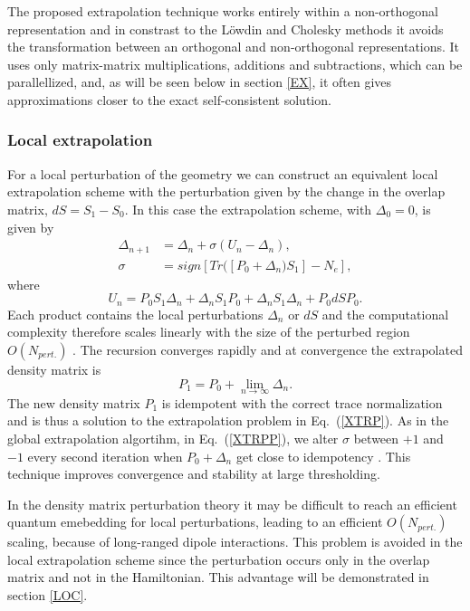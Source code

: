 \documentclass[twocolumn,showpacs,preprintnumbers,amsmath,amssymb]{revtex4}
\begin{document}
The proposed extrapolation technique works entirely within a non-orthogonal representation and 
in constrast to the L\"{o}wdin and Cholesky methods it avoids the
transformation between an orthogonal and non-orthogonal representations.
It uses only matrix-matrix multiplications, additions and subtractions, which can be
parallellized, and, as will be seen below in section \ref{EX}, it often gives approximations closer
to the exact self-consistent solution.

\subsubsection{Local extrapolation}

For a local perturbation of the geometry we can construct an equivalent 
local extrapolation scheme with the perturbation given by the change in the overlap matrix,
$dS = S_1 - S_0$. In this case the extrapolation scheme, with $\Delta_0 = 0$, is given by
\begin{equation}\label{XTR} \begin{array}{ll}
\Delta_{n+1} & = \Delta_n + \sigma (U_n - \Delta_n), \\
\sigma & = sign[ Tr([P_0 + \Delta_n)S_1]-N_e ], 
\end{array}
\end{equation}
where
\begin{equation}\label{XTR_T}
U_n =  P_0S_1\Delta_n + \Delta_nS_1P_0 + \Delta_nS_1\Delta_n +P_0dS P_0.
\end{equation}
Each product contains the local perturbations $\Delta_n$ or $dS$ and the computational
complexity therefore scales linearly with the size of the perturbed region $O(N_{pert.})$
\cite{NiklassonPRT1}.  The recursion converges rapidly and at convergence 
the extrapolated density matrix is
\begin{equation}\label{PNEW}
P_1 = P_0 + \lim_{n \rightarrow \infty} \Delta_n.
\end{equation}
The new density matrix $P_1$ is idempotent with the correct trace normalization and is thus a 
solution to the extrapolation problem in Eq.\ (\ref{XTRP}). As in the global extrapolation algortihm, 
in Eq.\ (\ref{XTRPP}), we alter $\sigma$ between $+1$ and $-1$ every second iteration
when $P_0+\Delta_n$  get close to idempotency \cite{NiklassonNO}.  This technique improves 
convergence and stability at large thresholding.

In the density matrix perturbation theory it may be difficult to reach
an efficient quantum emebedding for local perturbations, leading to an efficient
$O(N_{pert.})$ scaling, because of long-ranged dipole interactions. This problem 
is avoided in the local extrapolation scheme since the perturbation occurs 
only in the overlap matrix and not in the Hamiltonian. This advantage will
be demonstrated in section \ref{LOC}.
\end{document}
